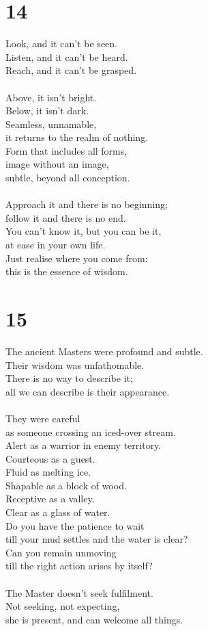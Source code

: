 \documentclass[b5paper, 12pt, oneside]{book}
\begin{document}
\chapter*{14}
Look, and it can't be seen.\\
Listen, and it can't be heard.\\
Reach, and it can't be grasped.\\
\\
Above, it isn't bright.\\
Below, it isn't dark.\\
Seamless, unnamable,\\
it returns to the realm of nothing.\\
Form that includes all forms,\\
image without an image,\\
subtle, beyond all conception.\\
\\
Approach it and there is no beginning;\\
follow it and there is no end.\\
You can't know it, but you can be it,\\
at ease in your own life.\\
Just realise where you come from:\\
this is the essence of wisdom.\\

\chapter*{15}
The ancient Masters were profound and subtle.\\
Their wisdom was unfathomable.\\
There is no way to describe it;\\
all we can describe is their appearance.\\
\\
They were careful\\
as someone crossing an iced-over stream.\\
Alert as a warrior in enemy territory.\\
Courteous as a guest.\\
Fluid as melting ice.\\
Shapable as a block of wood.\\
Receptive as a valley.\\
Clear as a glass of water.
\\
Do you have the patience to wait\\
till your mud settles and the water is clear?\\
Can you remain unmoving\\
till the right action arises by itself?\\
\\
The Master doesn't seek fulfilment.\\
Not seeking, not expecting,\\
she is present, and can welcome all things.\\
\end{document}
